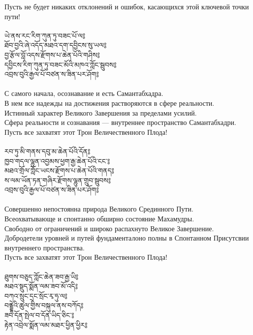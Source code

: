 Пусть не будет никаких отклонений и ошибок, касающихся этой ключевой точки пути!\\
\\
\newpage
\ti ཡེ་ནས་རང་རིག་ཀུན་ཏུ་བཟང་པོ་ལ༔\\
ཐོབ་བྱའི་ཞེ་འདོད་མཐའ་དག་དབྱིངས་སུ་ཡལ༔\\
བྱ་རྩོལ་བློ་འདས་རྫོགས་པ་ཆེན་པོའི་གཤིས༔\\
དབྱིངས་རིག་ཀུན་ཏུ་བཟང་མོའི་མཁའ་ཀློང་སྦུབས༔\\
འབྲས་བུའི་རྒྱལ་པོ་བཙན་ས་ཟིན་པར་ཤོག༔\\
\\
\ru
С самого начала, осознавание и есть Самантабхадра.\\
В нем все надежды на достижения растворяются в сфере реальности.\\
Истинный характер Великого Завершения за пределами усилий.\\
Сфера реальности и сознавания — внутреннее пространство Самантабхадри.\\
Пусть все захватят этот Трон Величественного Плода!\\
\\
\ti རབ་ཏུ་མི་གནས་དབུ་མ་ཆེན་པོའི་དོན༔\\
ཁྱབ་གདལ་ལྷུན་འབྱམས་ཕྱག་རྒྱ་ཆེན་པོའི་ངང༌༔\\
མཐའ་གྲོལ་ཀློང་ཡངས་རྫོགས་པ་ཆེན་པོའི་གནད༔\\
ས་ལམ་ཡོན་ཏན་གཞིར་རྫོགས་ལྷུན་གྲུབ་སྦུབས༔\\
འབྲས་བུའི་རྒྱལ་པོ་བཙན་ས་ཟིན་པར་ཤོག༔\\
\\
\ru
Совершенно непостоянна природа Великого Срединного Пути.\\
Всеохватывающе и спонтанно обширно состояние Махамудры.\\
Свободно от ограничений и широко распахнуто Великое Завершение.\\
Добродетели уровней и путей фундаменталоно полны в Спонтанном Присутсвии внутреннего пространства.\\
Пусть все захватят этот Трон Величественного Плода!\\
\\
\newpage
\ti ཐུགས་བཅུད་ཀློང་ཆེན་ཟབ་རྒྱ་ཡི༔\\
མཐའ་སྡུད་སྨོན་ལམ་ཟབ་མོ་འདི༔\\
བཀའ་སྲུང་དྲང་སྲོང་རྭ་ཧུ་ལ༔\\
བནྡྷེའི་ཚུལ་གྱིས་བསྐུལ་ནས་བཀོད༔\\
ཟབ་དོན་སྤེལ་བ་དོན་ཡིད་ཅིང༌༔\\
རྟེན་འབྲེལ་སྨོན་ལམ་མཐར་ཕྱིན་ཕྱིར༔\\
